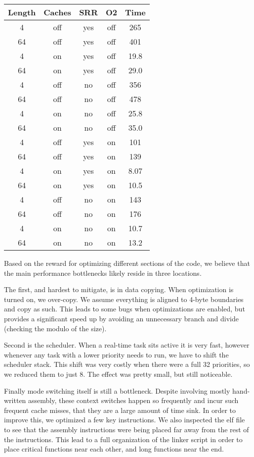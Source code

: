 \documentclass{article}
\begin{document}
\begin{center}
\begin{tabular}{c|c|c|c|c}
Length & Caches & SRR & O2 & Time \\ \hline
4 & off & yes & off & 265 \\
64 & off & yes & off & 401 \\
4 & on & yes & off & 19.8 \\
64 & on & yes & off & 29.0 \\
4 & off & no & off & 356 \\
64 & off & no & off & 478 \\
4 & on & no & off & 25.8 \\
64 & on & no & off & 35.0 \\
4 & off & yes & on & 101 \\
64 & off & yes & on & 139 \\
4 & on & yes & on & 8.07 \\
64 & on & yes & on & 10.5 \\
4 & off & no & on & 143 \\
64 & off & no & on & 176 \\
4 & on & no & on & 10.7 \\
64 & on & no & on & 13.2
\end{tabular}
\end{center}

Based on the reward for optimizing different sections of the code, we believe
that the main performance bottlenecks likely reside in three locations.

The first, and hardest to mitigate, is in data copying. When optimization is
turned on, we over-copy. We assume everything is aligned to 4-byte boundaries
and copy as such. This leads to some bugs when optimizations are enabled, but
provides a significant speed up by avoiding an unnecessary branch and divide
(checking the modulo of the size).

Second is the scheduler. When a real-time task sits active it is very fast,
however whenever any task with a lower priority needs to run, we have to shift
the scheduler stack. This shift was very costly when there were a full 32
priorities, so we reduced them to just 8. The effect was pretty small, but still
noticeable.

Finally mode switching itself is still a bottleneck.
Despite involving mostly hand-written assembly, these context switches happen so
frequently and incur such frequent cache misses, that they are a large amount of
time sink. In order to improve this, we optimized a few key instructions. We
also inspected the elf file to see that the assembly instructions were being
placed far away from the rest of the instructions. This lead to a full
organization of the linker script in order to place critical functions near each
other, and long functions near the end.
\end{document}

